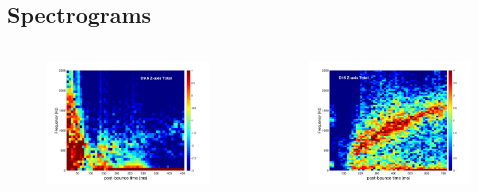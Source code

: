 \documentclass[aspectratio=169]{beamer}
\begin{document}
\subsection{Spectrograms}

\begin{frame}

  \begin{columns}[c]

      \begin{figure}
        \includegraphics[width=1.0\textwidth]{Figures/D9.6_spectrogram_TOTAL.pdf}
      \end{figure}

      \begin{figure}
        \includegraphics[width=1.0\textwidth]{Figures/D15_spectrogram_TOTAL.pdf}
      \end{figure}


\end{columns}
\end{frame}
\end{document}
